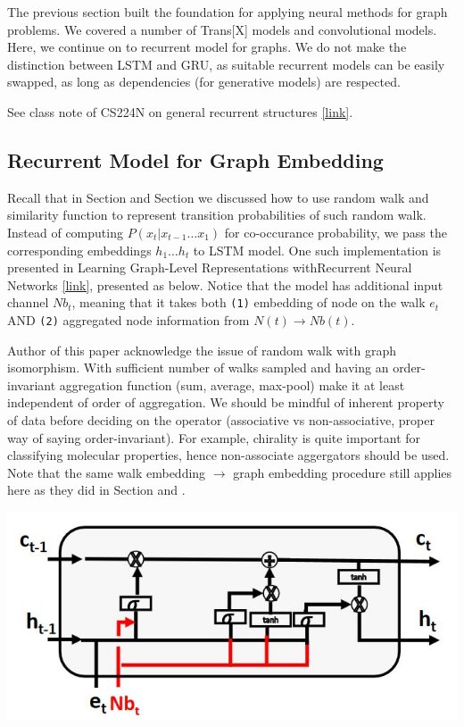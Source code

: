 The previous section built the foundation for applying neural methods for graph problems. We covered a number of Trans[X] models and convolutional models. Here, we continue on to recurrent model for graphs. We do not make the distinction between LSTM and GRU, as suitable recurrent models can be easily swapped, as long as dependencies (for generative models) are respected. 

See class note of CS224N on general recurrent structures \href{https://web.stanford.edu/class/archive/cs/cs224n/cs224n.1194/readings/cs224n-2019-notes05-LM_RNN.pdf}{[link]}.

\subsection{Recurrent Model for Graph Embedding}

Recall that in Section \label{ss_412_rand_walk} and Section \label{ss_42_graph_emb} we discussed how to use random walk and similarity function to represent transition probabilities of such random walk. Instead of computing $P(x_t | x_{t-1} \dots x_1)$ for co-occurance probability, we pass the corresponding embeddings $h_1 \dots h_t$ to LSTM model. One such implementation is presented in Learning Graph-Level Representations withRecurrent Neural Networks \href{https://arxiv.org/pdf/1805.07683.pdf}{[link]}, presented as below. Notice that the model has additional input channel $Nb_t$, meaning that it takes both \texttt{(1)} embedding of node on the walk $e_t$ AND \texttt{(2)} aggregated node information from $N(t) \rightarrow Nb(t)$. 

Author of this paper acknowledge the issue of random walk with graph isomorphism. With sufficient number of walks sampled and having an order-invariant aggregation function (sum, average, max-pool) make it at least independent of order of aggregation. We should be mindful of inherent property of data before deciding on the operator (associative vs non-associative, proper way of saying order-invariant). For example, chirality is quite important for classifying molecular properties, hence non-associate aggergators should be used. Note that the same walk embedding $\rightarrow$ graph embedding procedure still applies here as they did in Section \label{ss_412_rand_walk} and \label{ss_42_graph_emb}.

{
\centering
\includegraphics[width=0.7\linewidth]{notes/img/n6_lstm.JPG} \par
}

